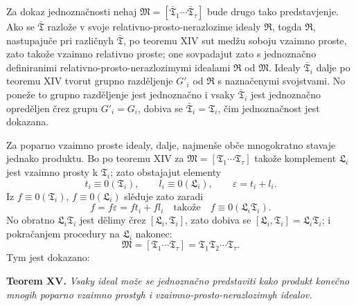 \documentclass[11pt]{article}
\newcommand{\ideal}[1]{\mathfrak{#1}}
\begin{document}
Za dokaz jednoznačnosti nehaj \(\ideal M=[\bar{\ideal T}_1\cdots\bar{\ideal T}_\tau]\) bude drugo tako predstavjenje. Ako se \(\bar{\ideal T}\) razlože v svoje relativno-prosto-nerazlozime idealy \(\ideal R\), togda \(\ideal R\), nastupajuče pri različnyh \(\bar{\ideal T}\), po teoremu XIV sut medžu soboju vzaimno proste, zato takože vzaimno relativno proste; one sovpadajut zato s jednoznačno definiranimi relativno-prosto-nerazlozimymi idealami \(\ideal R\) od \(\ideal M\). Idealy \(\bar{\ideal T}_i\) dalje po teoremu XIV tvorut grupno razděljenje \(G'_i\) od \(\ideal R\) s naznačenymi svojstvami. No poneže to grupno razděljenje jest jednoznačno i vsaky \(\bar{\ideal T}_i\) jest jednoznačno opreděljen črez grupu \(G'_i=G_i\), dobiva se \(\bar{\ideal T}_i=\ideal T_i\), čim jednoznačnost jest dokazana.

Za poparno vzaimno proste idealy, dalje, najmenše obče mnogokratno stavaje jednako produktu. Bo po teoremu XIV za \(\ideal M=[\ideal T_1\cdots\ideal T_\tau]\) takože komplement \(\ideal L_i\) jest vzaimno prosty k \(\ideal T_i\); zato obstajajut elementy
\[
 t_i\equiv0(\ideal T_i),
 \qquad
 l_i\equiv0(\ideal L_i),
 \qquad
 \varepsilon=t_i+l_i.
\]
Iz \(f\equiv0(\ideal T_i)\), \(f\equiv0(\ideal L_i)\) slěduje zato zaradi
\[
 f=f\varepsilon=ft_i+fl_i
 \quad\text{takože}\quad
 f\equiv0(\ideal L_i\ideal T_i).
\]
No obratno \(\ideal L_i\ideal T_i\) jest dělimy črez \([\ideal L_i,\ideal T_i]\), zato dobiva se \([\ideal L_i,\ideal T_i]=\ideal L_i\ideal T_i\); i pokračanjem procedury na \(\ideal L_i\) nakonec:
\[
 \ideal M=[\ideal T_1\cdots\ideal T_\tau]
       =\ideal T_1\ideal T_2\cdots\ideal T_\tau.
\]
Tym jest dokazano:

\textbf{Teorem XV.} \emph{Vsaky ideal može se jednoznačno predstaviti kako produkt konečno mnogih poparno vzaimno prostyh i vzaimno-prosto-nerazlozimyh idealov.}
\end{document}
